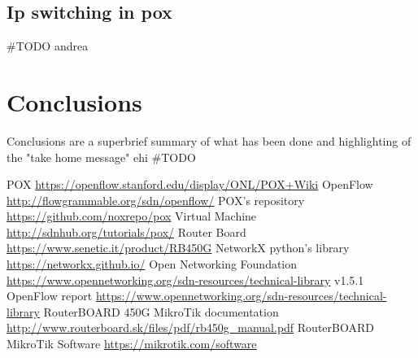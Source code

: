 \documentclass[conference,10pt]{IEEEtran}
\begin{document}
  \subsection{Ip switching in pox}
  \#TODO andrea
  
\section{Conclusions}\label{sec:conclusion}
Conclusions are a superbrief summary of what has been done and highlighting of the "take home message"
ehi
\#TODO
  

\begin{thebibliography}{99}
	 POX \url{https://openflow.stanford.edu/display/ONL/POX+Wiki}
	 OpenFlow \url{http://flowgrammable.org/sdn/openflow/}
	 POX's repository \url{https://github.com/noxrepo/pox}
	 Virtual Machine \url{http://sdnhub.org/tutorials/pox/}
	 Router Board \url{https://www.senetic.it/product/RB450G}
	 NetworkX python's library \url{https://networkx.github.io/}
	 Open Networking Foundation \url{https://www.opennetworking.org/sdn-resources/technical-library}
	 v1.5.1 OpenFlow report \url{https://www.opennetworking.org/sdn-resources/technical-library}
	 RouterBOARD 450G MikroTik documentation \url{http://www.routerboard.sk/files/pdf/rb450g_manual.pdf}
	 RouterBOARD MikroTik Software \url{https://mikrotik.com/software}
\end{thebibliography}
\end{document}
